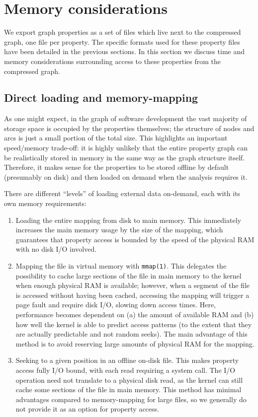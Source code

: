 \section{Memory considerations}

We export graph properties as a set of files which live next to the compressed
graph, one file per property. The specific formats used for these property
files have been detailed in the previous sections. In this section we discuss
time and memory considerations surrounding access to these properties from the
compressed graph.

\subsection{Direct loading and memory-mapping}

As one might expect, in the graph of software development the vast majority of
storage space is occupied by the properties themselves; the structure of nodes
and arcs is just a small portion of the total size. This highlights an
important speed/memory trade-off: it is highly unlikely that the entire
property graph can be realistically stored in memory in the same way as the
graph structure itself. Therefore, it makes sense for the properties to be
stored offline by default (presumably on disk) and then loaded on demand
when the analysis requires it.

There are different ``levels'' of loading external data on-demand, each with
its own memory requirements:

\begin{enumerate}
    \item Loading the entire mapping from disk to main memory. This immediately
        increases the main memory usage by the size of the mapping, which
        guarantees that property access is bounded by the speed of the physical
        RAM with no disk I/O involved.
    \item Mapping the file in virtual memory with \texttt{mmap(1)}. This
        delegates the possibility to cache large sections of the file in main
        memory to the kernel when enough physical RAM is available; however,
        when a segment of the file is accessed without having been cached,
        accessing the mapping will trigger a page fault and require disk I/O,
        slowing down access times.
        Here, performance becomes dependent on (a) the amount of available RAM
        and (b) how well the kernel is able to predict access patterns (to the
        extent that they are actually predictable and not random seeks).
        The main advantage of this method is to avoid reserving large amounts
        of physical RAM for the mapping.
    \item Seeking to a given position in an offline on-disk file. This makes
        property access fully I/O bound, with each read requiring a system
        call. The I/O operation need not translate to a physical disk read, as
        the kernel can still cache some sections of the file in main memory.
        This method has minimal advantages compared to memory-mapping for large
        files, so we generally do not provide it as an option for property
        access.
\end{enumerate}


